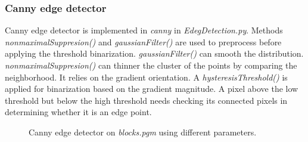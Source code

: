 \documentclass[paper=a4, fontsize=11pt]{scrartcl}
\begin{document}
\subsubsection{Canny edge detector}

Canny edge detector is implemented in \emph{canny} in \emph{EdegDetection.py}.
Methods \emph{nonmaximalSuppresion()} and \emph{gaussianFilter()} are used to preprocess before applying the threshold binarization.
\emph{gaussianFilter()} can smooth the distribution.
\emph{nonmaximalSuppresion()} can thinner the cluster of the points by comparing the neighborhood.
It relies on the gradient orientation.
A \emph{hysteresisThreshold()} is applied for binarization based on the gradient magnitude.
A pixel above the low threshold but below the high threshold needs checking its connected pixels in determining whether it is an edge point.


\begin{figure}[h]
\centering
{}
\caption{Canny edge detector on \emph{blocks.pgm} using different parameters.}
\label{fig:edge:02:canny}
\end{figure}
\end{document}
